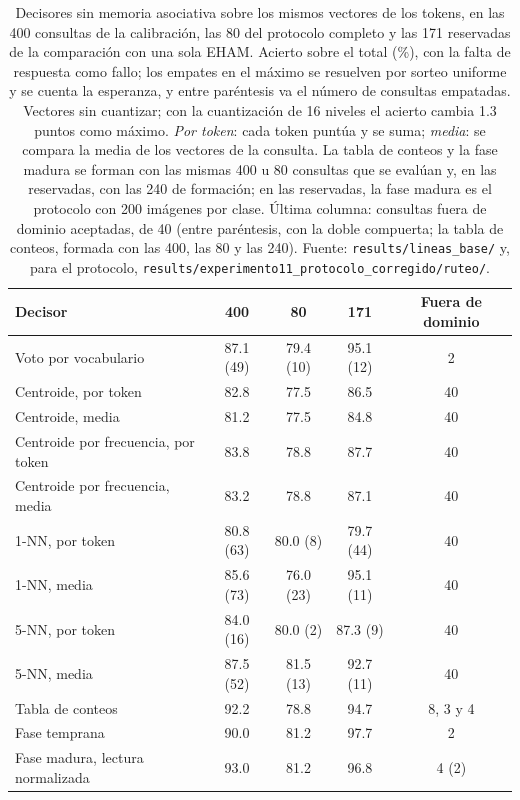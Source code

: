 \begin{table}[H]
    \centering
    \caption[Decisores sin memoria asociativa sobre los vectores de los tokens]{Decisores sin memoria asociativa sobre los mismos vectores de los tokens, en
    las 400 consultas de la calibración, las 80 del protocolo completo y las 171
    reservadas de la comparación con una sola EHAM. Acierto sobre el total (\%), con la
    falta de respuesta como fallo; los empates en el máximo se resuelven por sorteo
    uniforme y se cuenta la esperanza, y entre paréntesis va el número de consultas
    empatadas. Vectores sin cuantizar; con la cuantización de 16 niveles el acierto
    cambia 1.3 puntos como máximo. \emph{Por token}: cada token puntúa y se suma;
    \emph{media}: se compara la media de los vectores de la consulta. La tabla de conteos
    y la fase madura se forman con las mismas 400 u 80 consultas que se evalúan y, en las
    reservadas, con las 240 de formación; en las reservadas, la fase madura es el
    protocolo con 200 imágenes por clase. Última columna: consultas fuera de dominio
    aceptadas, de 40 (entre paréntesis, con la doble compuerta; la tabla de conteos,
    formada con las 400, las 80 y las 240). Fuente: \texttt{results/lineas\_base/} y,
    para el protocolo, \texttt{results/experimento11\_protocolo\_corregido/ruteo/}.}
    \label{tab:lineas-base-texto}
    \small
    \begin{tabular}{lcccc}
        \toprule
        Decisor & 400 & 80 & 171 & Fuera de dominio \\
        \midrule
        Voto por vocabulario                & 87.1 (49) & 79.4 (10) & 95.1 (12) & 2 \\
        Centroide, por token                & 82.8      & 77.5      & 86.5      & 40 \\
        Centroide, media                    & 81.2      & 77.5      & 84.8      & 40 \\
        Centroide por frecuencia, por token & 83.8      & 78.8      & 87.7      & 40 \\
        Centroide por frecuencia, media     & 83.2      & 78.8      & 87.1      & 40 \\
        1-NN, por token                     & 80.8 (63) & 80.0 (8)  & 79.7 (44) & 40 \\
        1-NN, media                         & 85.6 (73) & 76.0 (23) & 95.1 (11) & 40 \\
        5-NN, por token                     & 84.0 (16) & 80.0 (2)  & 87.3 (9)  & 40 \\
        5-NN, media                         & 87.5 (52) & 81.5 (13) & 92.7 (11) & 40 \\
        \midrule
        Tabla de conteos                    & 92.2      & 78.8      & 94.7      & 8, 3 y 4 \\
        \midrule
        Fase temprana                       & 90.0      & 81.2      & 97.7      & 2 \\
        Fase madura, lectura normalizada    & 93.0      & 81.2      & 96.8      & 4 (2) \\
        \bottomrule
    \end{tabular}
\end{table}

